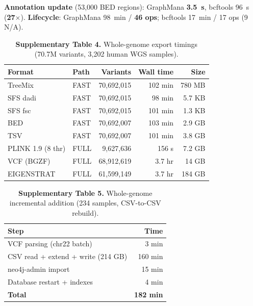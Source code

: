 \documentclass[11pt,a4paper]{article}
\begin{document}
\noindent\textbf{Annotation update} (53,000 BED regions): GraphMana \textbf{3.5~s}, bcftools 96~s (\textbf{27$\times$}).
\textbf{Lifecycle}: GraphMana 98~min / \textbf{46 ops}; bcftools 17~min / 17 ops (9 N/A).

\begin{table}[h]
\caption{\textbf{Supplementary Table 4.} Whole-genome export timings (70.7M variants, 3,202 human WGS samples).}
\begin{tabular}{@{}llrrr@{}}
\toprule
Format & Path & Variants & Wall time & Size \\
\midrule
TreeMix & FAST & 70,692,015 & 102 min & 780 MB \\
SFS dadi & FAST & 70,692,015 & 98 min & 5.7 KB \\
SFS fsc & FAST & 70,692,015 & 101 min & 1.3 KB \\
BED & FAST & 70,692,007 & 103 min & 2.9 GB \\
TSV & FAST & 70,692,007 & 101 min & 3.8 GB \\
PLINK 1.9 (8 thr) & FULL & 9,627,636 & 156 s & 7.2 GB \\
VCF (BGZF) & FULL & 68,912,619 & 3.7 hr & 14 GB \\
EIGENSTRAT & FULL & 61,599,149 & 3.7 hr & 184 GB \\
\bottomrule
\end{tabular}
\end{table}

\begin{table}[h]
\caption{\textbf{Supplementary Table 5.} Whole-genome incremental addition (234 samples, CSV-to-CSV rebuild).}
\begin{tabular}{@{}lr@{}}
\toprule
Step & Time \\
\midrule
VCF parsing (chr22 batch) & 3 min \\
CSV read + extend + write (214 GB) & 160 min \\
neo4j-admin import & 15 min \\
Database restart + indexes & 4 min \\
\textbf{Total} & \textbf{182 min} \\
\bottomrule
\end{tabular}
\end{table}
\end{document}
